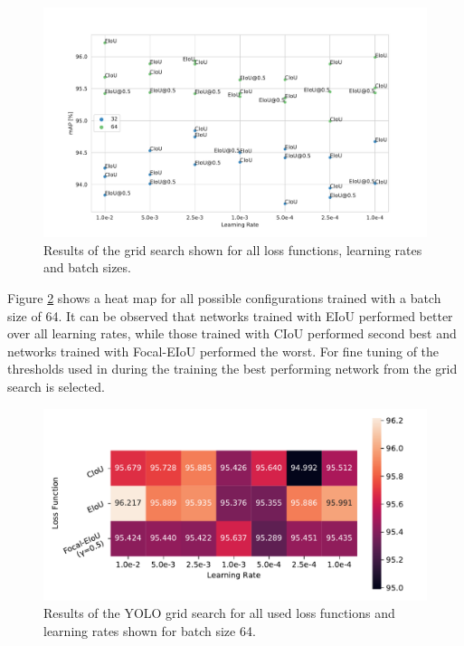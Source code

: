 \begin{figure}
\begin{center}
    \includegraphics[width=12cm]{imgs/yolo_grid_bs_compare.pdf}
    \caption{Results of the grid search shown for all loss functions, learning rates and batch sizes.}
    \label{fig:yolo_grid_bs_compare_results}
\end{center}
\end{figure}

Figure \ref{fig:yolo_grid_heat_results} shows a heat map for all possible configurations trained with a batch size of 64.
It can be observed that networks trained with \ac{EIoU} performed better over all learning rates, while those trained with \ac{CIoU} performed second best and networks trained with Focal-\ac{EIoU} performed the worst.
For fine tuning of the thresholds used in during the training the best performing network from the grid search is selected.

\begin{figure}
\begin{center}
    \includegraphics[width=16cm]{imgs/yolo_grid_heat.pdf}
    \caption{Results of the YOLO grid search for all used loss functions and learning rates shown for batch size 64.}
    \label{fig:yolo_grid_heat_results}
\end{center}
\end{figure}

